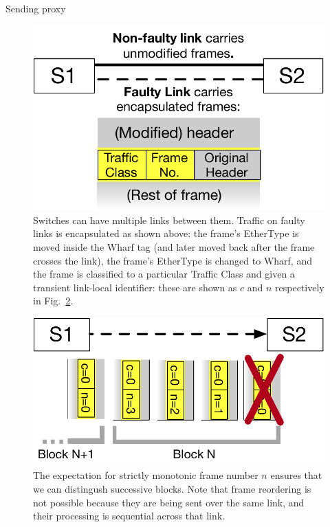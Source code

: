 \documentclass[sigconf]{acmart}
\newcommand{\OurSys}{Wharf\xspace}
\begin{document}
\begin{algorithm}
\caption{\label{alg:sending}Sending proxy}
\end{algorithm}

\begin{figure}
  \centering
  \includegraphics[width=0.3\paperwidth]{header_format.pdf}
  \caption{\label{fig:format}Switches can have multiple links between them.
  Traffic on faulty links is encapsulated as shown above: the frame's EtherType
  is moved inside the \OurSys tag (and later moved back after the frame crosses
  the link), the frame's EtherType is changed to \OurSys, and the frame is
  classified to a particular Traffic Class and given a transient link-local
  identifier: these are shown as $c$ and $n$ respectively in
  Fig.~\ref{fig:example-loss}.}
\end{figure}

\begin{figure}
  \centering
  \includegraphics[width=0.4\paperwidth]{loss_example.pdf}
  \caption{\label{fig:example-loss}The expectation for strictly monotonic frame
  number $n$ ensures that we can distingush successive blocks. Note that frame
  reordering is not possible because they are being sent over the same link,
  and their processing is sequential across that link.}
\end{figure}
\end{document}
